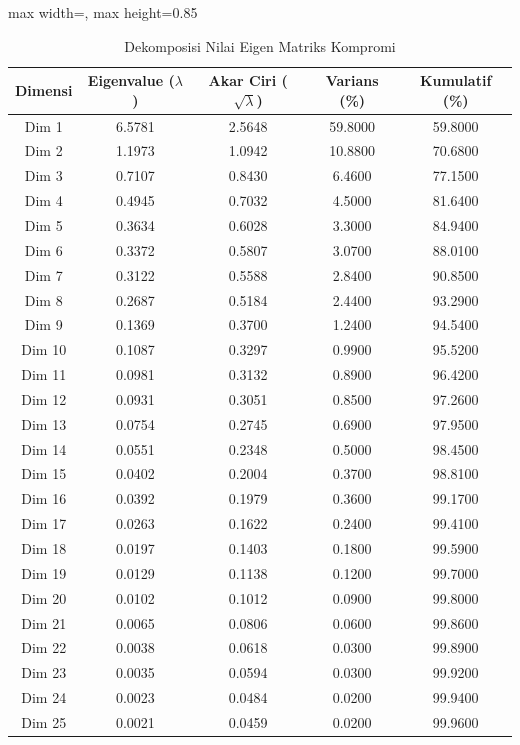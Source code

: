\begin{table}[H]
\centering
\caption{Dekomposisi Nilai Eigen Matriks Kompromi} \label{tab:appeigen}
\begin{adjustbox}{max width=\textwidth, max height=0.85\textheight}
\begin{tabular}{|c|c|c|c|c|}
\hline
\textbf{Dimensi} & \textbf{Eigenvalue ($\lambda$)} & \textbf{Akar Ciri ($\sqrt{\lambda}$)} & \textbf{Varians (\%)} & \textbf{Kumulatif (\%)} \\
\hline
Dim 1 & 6.5781 & 2.5648 & 59.8000 & 59.8000 \\
Dim 2 & 1.1973 & 1.0942 & 10.8800 & 70.6800 \\
Dim 3 & 0.7107 & 0.8430 & 6.4600 & 77.1500 \\
Dim 4 & 0.4945 & 0.7032 & 4.5000 & 81.6400 \\
Dim 5 & 0.3634 & 0.6028 & 3.3000 & 84.9400 \\
Dim 6 & 0.3372 & 0.5807 & 3.0700 & 88.0100 \\
Dim 7 & 0.3122 & 0.5588 & 2.8400 & 90.8500 \\
Dim 8 & 0.2687 & 0.5184 & 2.4400 & 93.2900 \\
Dim 9 & 0.1369 & 0.3700 & 1.2400 & 94.5400 \\
Dim 10 & 0.1087 & 0.3297 & 0.9900 & 95.5200 \\
Dim 11 & 0.0981 & 0.3132 & 0.8900 & 96.4200 \\
Dim 12 & 0.0931 & 0.3051 & 0.8500 & 97.2600 \\
Dim 13 & 0.0754 & 0.2745 & 0.6900 & 97.9500 \\
Dim 14 & 0.0551 & 0.2348 & 0.5000 & 98.4500 \\
Dim 15 & 0.0402 & 0.2004 & 0.3700 & 98.8100 \\
Dim 16 & 0.0392 & 0.1979 & 0.3600 & 99.1700 \\
Dim 17 & 0.0263 & 0.1622 & 0.2400 & 99.4100 \\
Dim 18 & 0.0197 & 0.1403 & 0.1800 & 99.5900 \\
Dim 19 & 0.0129 & 0.1138 & 0.1200 & 99.7000 \\
Dim 20 & 0.0102 & 0.1012 & 0.0900 & 99.8000 \\
Dim 21 & 0.0065 & 0.0806 & 0.0600 & 99.8600 \\
Dim 22 & 0.0038 & 0.0618 & 0.0300 & 99.8900 \\
Dim 23 & 0.0035 & 0.0594 & 0.0300 & 99.9200 \\
Dim 24 & 0.0023 & 0.0484 & 0.0200 & 99.9400 \\
Dim 25 & 0.0021 & 0.0459 & 0.0200 & 99.9600 \\

\end{tabular}
\end{adjustbox}
\end{table}
